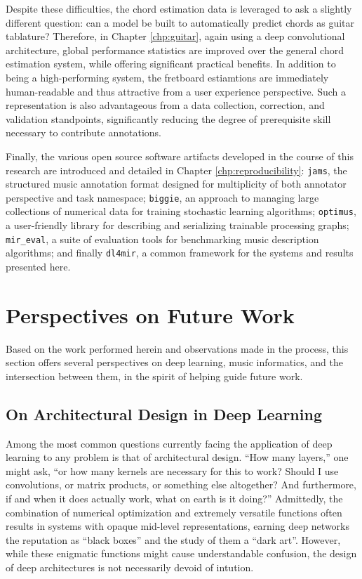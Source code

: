 Despite these difficulties, the chord estimation data is leveraged to ask a slightly different question: can a model be built to automatically predict chords as guitar tablature?
Therefore, in Chapter \ref{chp:guitar}, again using a deep convolutional architecture, global performance statistics are improved over the general chord estimation system, while offering significant practical benefits.
In addition to being a high-performing system, the fretboard estiamtions are immediately human-readable and thus attractive from a user experience perspective.
Such a representation is also advantageous from a data collection, correction, and validation standpoints, significantly reducing the degree of prerequisite skill necessary to contribute annotations.

Finally, the various open source software artifacts developed in the course of this research are introduced and detailed in Chapter \ref{chp:reproducibility}:
\texttt{jams}, the structured music annotation format designed for multiplicity of both annotator perspective and task namespace;
\texttt{biggie}, an approach to managing large collections of numerical data for training stochastic learning algorithms;
\texttt{optimus}, a user-friendly library for describing and serializing trainable processing graphs;
\texttt{mir\_eval}, a suite of evaluation tools for benchmarking music description algorithms;
and finally \texttt{dl4mir}, a common framework for the systems and results presented here.


\section{Perspectives on Future Work}
\label{sec:future}

Based on the work performed herein and observations made in the process, this section offers several perspectives on deep learning, music informatics, and the intersection between them, in the spirit of helping guide future work.


\subsection{On Architectural Design in Deep Learning}

Among the most common questions currently facing the application of deep learning to any problem is that of architectural design.
``How many layers,'' one might ask, ``or how many kernels are necessary for this to work?
Should I use convolutions, or matrix products, or something else altogether?
And furthermore, if and when it does actually work, what on earth is it doing?''
Admittedly, the combination of numerical optimization and extremely versatile functions often results in systems with opaque mid-level representations, earning deep networks the reputation as ``black boxes'' and the study of them a ``dark art''.
However, while these enigmatic functions might cause understandable confusion, the design of deep architectures is not necessarily devoid of intution.

